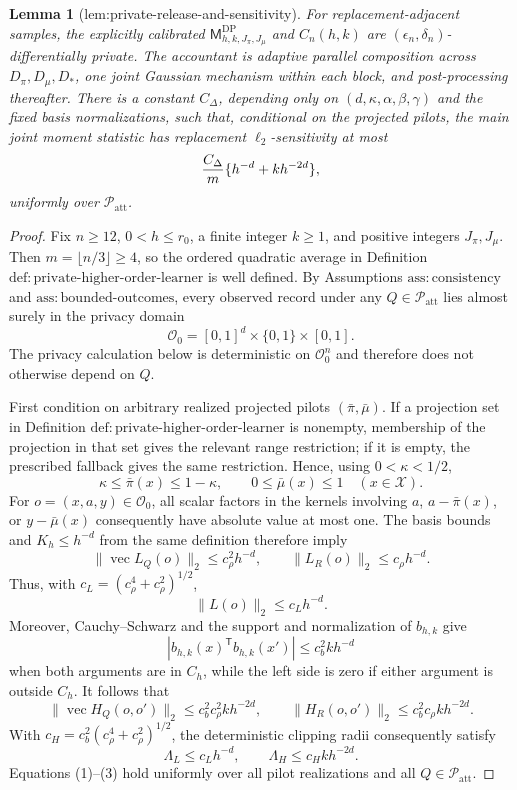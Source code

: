 \documentclass{article}
\newtheorem{lemma}{Lemma}
\begin{document}
\begin{lemma}[lem:private-release-and-sensitivity]\label{lem:private-release-and-sensitivity}
For replacement-adjacent samples, the explicitly calibrated \(\mathsf M_{h,k,J_\pi,J_\mu}^{\mathrm{DP}}\) and \(C_n(h,k)\) are \((\epsilon_n,\delta_n)\)-differentially private.  The accountant is adaptive parallel composition across \(D_\pi,D_\mu,D_*\), one joint Gaussian mechanism within each block, and post-processing thereafter.  There is a constant \(C_\Delta\), depending only on \((d,\kappa,\alpha,\beta,\gamma)\) and the fixed basis normalizations, such that, conditional on the projected pilots, the main joint moment statistic has replacement \(\ell_2\)-sensitivity at most
\[
 {C_\Delta\over m}\{h^{-d}+k h^{-2d}\},
\]
uniformly over \(\mathcal P_{\mathrm{att}}\).
\end{lemma}
\begin{proof}
Fix \(n\ge 12\), \(0<h\le r_0\), a finite integer \(k\ge1\), and positive integers \(J_\pi,J_\mu\).  Then \(m=\lfloor n/3\rfloor\ge4\), so the ordered quadratic average in Definition \(\mathrm{def{:}private\text{-}higher\text{-}order\text{-}learner}\) is well defined.  By Assumptions \(\mathrm{ass{:}consistency}\) and \(\mathrm{ass{:}bounded\text{-}outcomes}\), every observed record under any \(Q\in\mathcal P_{\mathrm{att}}\) lies almost surely in the privacy domain
\[
 \mathcal O_0=[0,1]^d\times\{0,1\}\times[0,1].
\]
The privacy calculation below is deterministic on \(\mathcal O_0^n\) and therefore does not otherwise depend on \(Q\).

First condition on arbitrary realized projected pilots \((\bar\pi,\bar\mu)\).  If a projection set in Definition \(\mathrm{def{:}private\text{-}higher\text{-}order\text{-}learner}\) is nonempty, membership of the projection in that set gives the relevant range restriction; if it is empty, the prescribed fallback gives the same restriction.  Hence, using \(0<\kappa<1/2\),
\[
 \kappa\le \bar\pi(x)\le1-\kappa,
 \qquad 0\le\bar\mu(x)\le1
 \quad (x\in\mathcal X).
\tag{1}
\]
For \(o=(x,a,y)\in\mathcal O_0\), all scalar factors in the kernels involving \(a\), \(a-\bar\pi(x)\), or \(y-\bar\mu(x)\) consequently have absolute value at most one.  The basis bounds and \(K_h\le h^{-d}\) from the same definition therefore imply
\[
 \|\operatorname{vec}L_Q(o)\|_2\le c_\rho^2h^{-d},
 \qquad
 \|L_R(o)\|_2\le c_\rho h^{-d}.
\]
Thus, with \(c_L=(c_\rho^4+c_\rho^2)^{1/2}\),
\[
 \|L(o)\|_2\le c_Lh^{-d}.
\tag{2}
\]
Moreover, Cauchy--Schwarz and the support and normalization of \(b_{h,k}\) give
\[
 |b_{h,k}(x)^{\mathsf T}b_{h,k}(x')|
 \le c_b^2kh^{-d}
\]
when both arguments are in \(C_h\), while the left side is zero if either argument is outside \(C_h\).  It follows that
\[
 \|\operatorname{vec}H_Q(o,o')\|_2
 \le c_b^2c_\rho^2kh^{-2d},
 \qquad
 \|H_R(o,o')\|_2
 \le c_b^2c_\rho kh^{-2d}.
\]
With \(c_H=c_b^2(c_\rho^4+c_\rho^2)^{1/2}\), the deterministic clipping radii consequently satisfy
\[
 \Lambda_L\le c_Lh^{-d},
 \qquad
 \Lambda_H\le c_Hkh^{-2d}.
\tag{3}
\]
Equations (1)--(3) hold uniformly over all pilot realizations and all \(Q\in\mathcal P_{\mathrm{att}}\).


\end{proof}
\end{document}
